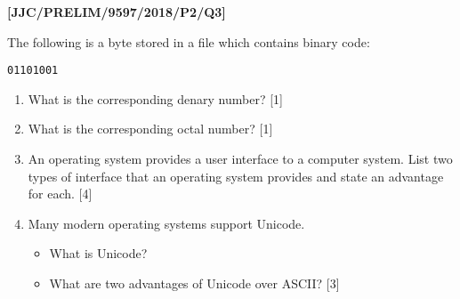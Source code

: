 \item \textbf{{[}JJC/PRELIM/9597/2018/P2/Q3{]} }

The following is a byte stored in a file which contains binary code: 
\noindent \begin{center}
\texttt{01101001}
\par\end{center}
\begin{enumerate}
\item What is the corresponding denary number? \hfill{}{[}1{]}
\item What is the corresponding octal number?\hfill{} {[}1{]}
\item An operating system provides a user interface to a computer system.
List two types of interface that an operating system provides and
state an advantage for each. \hfill{}{[}4{]}
\item Many modern operating systems support Unicode. 
\begin{itemize}
\item What is Unicode? 
\item What are two advantages of Unicode over ASCII? \hfill{}{[}3{]}
\end{itemize}
\end{enumerate}
